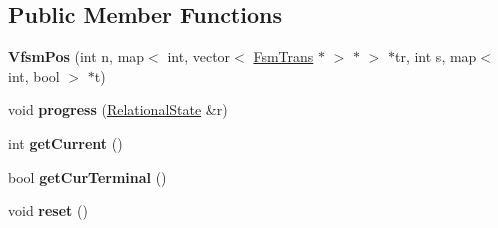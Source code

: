 \subsection*{Public Member Functions}
\begin{DoxyCompactItemize}
\item 
\hypertarget{classCartWheel_1_1VfsmPos_af2fcc1246740f8b8189374a4926d3e79}{
{\bfseries VfsmPos} (int n, map$<$ int, vector$<$ \hyperlink{classCartWheel_1_1FsmTrans}{FsmTrans} $\ast$ $>$ $\ast$ $>$ $\ast$tr, int s, map$<$ int, bool $>$ $\ast$t)}
\label{classCartWheel_1_1VfsmPos_af2fcc1246740f8b8189374a4926d3e79}

\item 
\hypertarget{classCartWheel_1_1VfsmPos_a1b752708decf4e526e98809f4969fa80}{
void {\bfseries progress} (\hyperlink{classCartWheel_1_1RelationalState}{RelationalState} \&r)}
\label{classCartWheel_1_1VfsmPos_a1b752708decf4e526e98809f4969fa80}

\item 
\hypertarget{classCartWheel_1_1VfsmPos_a765f9816abe3d638d9621ac66ae54619}{
int {\bfseries getCurrent} ()}
\label{classCartWheel_1_1VfsmPos_a765f9816abe3d638d9621ac66ae54619}

\item 
\hypertarget{classCartWheel_1_1VfsmPos_afa29bed33d8554085f7ee170c496c014}{
bool {\bfseries getCurTerminal} ()}
\label{classCartWheel_1_1VfsmPos_afa29bed33d8554085f7ee170c496c014}

\item 
\hypertarget{classCartWheel_1_1VfsmPos_a1324f525c517e147cbb1ddb86f23cb8a}{
void {\bfseries reset} ()}
\label{classCartWheel_1_1VfsmPos_a1324f525c517e147cbb1ddb86f23cb8a}

\end{DoxyCompactItemize}
